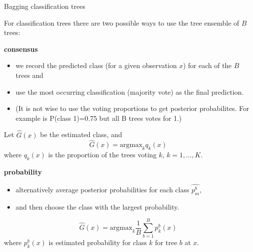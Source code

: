 \documentclass[
  ignorenonframetext,
]{beamer}
\providecommand{\tightlist}{%
  \setlength{\itemsep}{0pt}\setlength{\parskip}{0pt}}
\begin{document}
\begin{frame}

\begin{block}{Bagging classification trees}

For classification trees there are two possible ways to use the tree
ensemble of \(B\) trees:

\textbf{consensus}

\begin{itemize}
\tightlist
\item
  we record the predicted class (for a given observation \(x\)) for each
  of the \(B\) trees and
\item
  use the most occurring classification (majority vote) as the final
  prediction.
\item
  (It is not wise to use the voting proportions to get posterior
  probabilites. For example is P(class 1)=0.75 but all B trees votes for
  1.)
\end{itemize}

Let \(\hat{G}(x)\) be the estimated class, and
\[\hat{G}(x)=\text{argmax}_k q_k(x)\] where \(q_k(x)\) is the proportion
of the trees voting \(k\), \(k=1,\ldots,K\).

\end{block}

\end{frame}

\begin{frame}

\textbf{probability}

\begin{itemize}
\tightlist
\item
  alternatively average posterior probabilities for each class
  \(\hat{p_m^b}\),
\item
  and then choose the class with the largest probability.
\end{itemize}

\[\hat{G}(x)=\text{argmax}_k \frac{1}{B} \sum_{b=1}^B p^b_k(x)\] where
\(p^b_k(x)\) is estimated probability for class \(k\) for tree \(b\) at
\(x\).

\end{frame}
\end{document}
